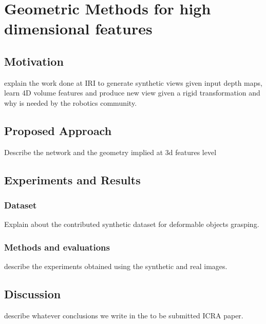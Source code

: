 \chapter{Geometric Methods for high dimensional features}
\label{chap:chap_05}
\vspace{-8mm}

\section{Motivation}

explain the work done at IRI to generate synthetic views given input depth maps, learn 4D volume features and produce new view given a rigid transformation and why is needed by the robotics community.

\section{Proposed Approach}

Describe the network and the geometry implied at 3d features level


\section{Experiments and Results}

\subsection{Dataset}

Explain about the contributed synthetic dataset for deformable objects grasping.

\subsection{Methods and evaluations}

describe the experiments obtained using the synthetic and real images.

\section{Discussion}

describe whatever conclusions we write in the to be submitted ICRA paper.